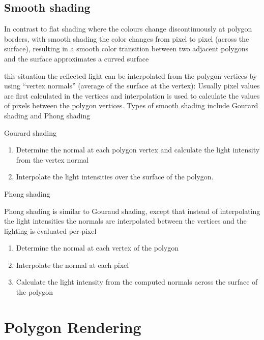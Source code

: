 \documentclass[
]{book}
\providecommand{\tightlist}{%
  \setlength{\itemsep}{0pt}\setlength{\parskip}{0pt}}
\begin{document}
\hypertarget{smooth-shading}{%
\subsection{Smooth shading}\label{smooth-shading}}

In contrast to flat shading where the colours change discontinuously at polygon borders, with smooth shading the color changes from pixel to pixel (across the surface), resulting in a smooth color transition between two adjacent polygons and the surface {approximates a curved surface}

this situation the reflected light can be interpolated from the polygon vertices by using ``vertex normals'' ({average of the surface at the vertex)}:
Usually pixel values are first calculated in the vertices and interpolation is used to calculate the values of pixels between the polygon vertices. Types of smooth shading include {Gourard shading} and {Phong shading}

Gourard shading

\begin{enumerate}
\def\labelenumi{\arabic{enumi}.}
\tightlist
\item
  Determine the normal at each polygon vertex and calculate the light intensity from the vertex normal
\item
  {Interpolate the light intensities} over the surface of the polygon.
\end{enumerate}

Phong shading

Phong shading is similar to Gouraud shading, except that instead of interpolating the light intensities the normals are interpolated between the vertices and the lighting is evaluated per-pixel

\begin{enumerate}
\def\labelenumi{\arabic{enumi}.}
\tightlist
\item
  Determine the normal at each vertex of the polygon
\item
  {Interpolate the normal at each pixel}
\item
  Calculate the light intensity from the computed normals across the surface of the polygon
\end{enumerate}

\hypertarget{polygon-rendering}{%
\section{Polygon Rendering}\label{polygon-rendering}}
\end{document}
